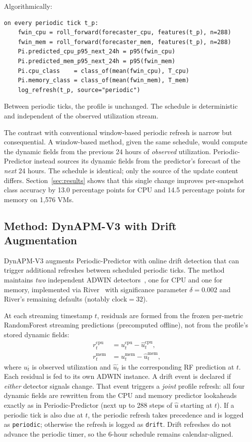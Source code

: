 \documentclass[manuscript,screen,review,anonymous]{acmart}
\begin{document}
Algorithmically:
\begin{verbatim}
on every periodic tick t_p:
    fwin_cpu = roll_forward(forecaster_cpu, features(t_p), n=288)
    fwin_mem = roll_forward(forecaster_mem, features(t_p), n=288)
    Pi.predicted_cpu_p95_next_24h = p95(fwin_cpu)
    Pi.predicted_mem_p95_next_24h = p95(fwin_mem)
    Pi.cpu_class    = class_of(mean(fwin_cpu), T_cpu)
    Pi.memory_class = class_of(mean(fwin_mem), T_mem)
    log_refresh(t_p, source="periodic")
\end{verbatim}

Between periodic ticks, the profile is unchanged. The schedule is
deterministic and independent of the observed utilization stream.

The contrast with conventional window-based periodic refresh is
narrow but consequential. A window-based method, given the same
schedule, would compute the dynamic fields from the previous 24
hours of \emph{observed} utilization. Periodic-Predictor instead
sources its dynamic fields from the predictor's forecast of the
\emph{next} 24 hours. The schedule is identical; only the source
of the update content differs. Section~\ref{sec:results} shows
that this single change improves per-snapshot class accuracy by
13.0 percentage points for CPU and 14.5 percentage points for
memory on 1{,}576 VMs.

\subsection{Method: DynAPM-V3 with Drift Augmentation}\label{sec:framework-v3}

DynAPM-V3 augments Periodic-Predictor with online drift detection
that can trigger additional refreshes between scheduled periodic
ticks. The method maintains \emph{two} independent ADWIN
detectors~\cite{bifet_adwin_2007}, one for CPU and one for memory,
implemented via River~\cite{montiel_river_2021} with significance
parameter $\delta = 0.002$ and River's remaining defaults
(notably $\mathrm{clock}=32$).

At each streaming timestamp $t$, residuals are formed from the
frozen per-metric RandomForest streaming predictions
(precomputed offline), not from the profile's stored dynamic
fields:
\begin{align}
r^{\mathrm{cpu}}_t &= u^{\mathrm{cpu}}_t - \hat{u}^{\mathrm{cpu}}_t, \\
r^{\mathrm{mem}}_t &= u^{\mathrm{mem}}_t - \hat{u}^{\mathrm{mem}}_t,
\end{align}
where $u^{\cdot}_t$ is observed utilization and
$\hat{u}^{\cdot}_t$ is the corresponding RF prediction at $t$.
Each residual is fed to its own ADWIN instance. A drift event is
declared if \emph{either} detector signals change. That event
triggers a \emph{joint} profile refresh: all four dynamic fields
are rewritten from the CPU and memory predictor lookaheads
exactly as in Periodic-Predictor (next up to 288 steps of
$\hat{u}$ starting at $t$). If a periodic tick is also due at
$t$, the periodic refresh takes precedence and is logged as
\texttt{periodic}; otherwise the refresh is logged as
\texttt{drift}. Drift refreshes do not advance the periodic
timer, so the 6-hour schedule remains calendar-aligned.
\end{document}
